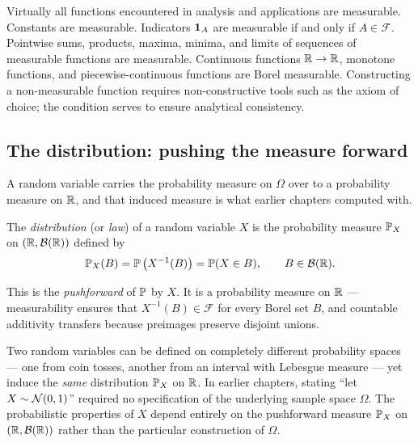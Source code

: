 \begin{example}
\label{ch36:meas-examples}
Virtually all functions encountered in analysis and applications are measurable.
Constants are measurable. Indicators $\ind_A$ are measurable if and only if $A \in \mathcal{F}$.
Pointwise sums, products, maxima, minima, and limits of sequences of measurable functions
are measurable. Continuous functions $\R \to \R$, monotone functions, and piecewise-continuous
functions are Borel measurable. Constructing a non-measurable function requires non-constructive
tools such as the axiom of choice; the condition serves to ensure analytical consistency.
\end{example}

\subsection{The distribution: pushing the measure forward}

A random variable carries the probability measure on $\Omega$ over to a
probability measure on $\R$, and that induced measure is what earlier chapters
computed with.

\begin{definition}
\label{ch36:law}
The \emph{distribution} (or \emph{law}) of a random variable $X$ is the
probability measure $\P_X$ on $(\R, \mathcal{B}(\R))$ defined by
\[
  \P_X(B) = \P\big(X^{-1}(B)\big) = \P(X \in B),
  \qquad B \in \mathcal{B}(\R).
\]
\end{definition}

This is the \emph{pushforward} of $\P$ by $X$. It is a probability
measure on $\R$ --- measurability ensures that $X^{-1}(B) \in \mathcal{F}$
for every Borel set $B$, and countable additivity transfers because preimages
preserve disjoint unions.

\begin{aestheticbox}
Two random variables can be defined on completely different probability spaces ---
one from coin tosses, another from an interval with Lebesgue measure --- yet induce
the \emph{same} distribution $\P_X$ on $\R$. In earlier chapters, stating
``let $X \sim \Normal(0,1)$'' required no specification of the underlying sample space
$\Omega$. The probabilistic properties of $X$ depend entirely on the pushforward
measure $\P_X$ on $(\R, \mathcal{B}(\R))$ rather than the particular construction of $\Omega$.
\end{aestheticbox}

